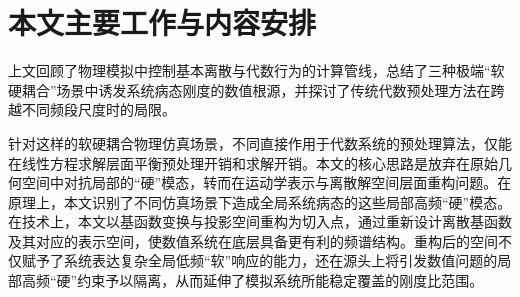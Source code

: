 \usetikzlibrary{arrows.meta,positioning}


\section{本文主要工作与内容安排}
上文回顾了物理模拟中控制基本离散与代数行为的计算管线，总结了三种极端“软硬耦合”场景中诱发系统病态刚度的数值根源，并探讨了传统代数预处理方法在跨越不同频段尺度时的局限。

针对这样的软硬耦合物理仿真场景，不同直接作用于代数系统的预处理算法，仅能在线性方程求解层面平衡预处理开销和求解开销。本文的核心思路是放弃在原始几何空间中对抗局部的“硬”模态，转而在运动学表示与离散解空间层面重构问题。在原理上，本文识别了不同仿真场景下造成全局系统病态的这些局部高频“硬”模态。在技术上，本文以基函数变换与投影空间重构为切入点，通过重新设计离散基函数及其对应的表示空间，使数值系统在底层具备更有利的频谱结构。重构后的空间不仅赋予了系统表达复杂全局低频“软”响应的能力，还在源头上将引发数值问题的局部高频“硬”约束予以隔离，从而延伸了模拟系统所能稳定覆盖的刚度比范围。


